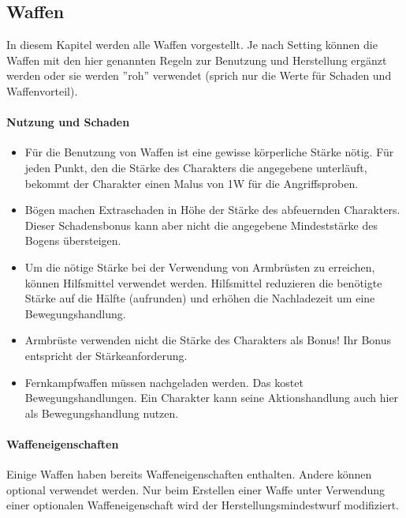 \documentclass{article}
\begin{document}
\begin{center}
\subsection{Waffen}
\end{center}

In diesem Kapitel werden alle Waffen vorgestellt. Je nach Setting können die Waffen mit den hier genannten Regeln
zur Benutzung und Herstellung ergänzt werden oder sie werden ''roh'' verwendet (sprich nur die Werte für Schaden und
Waffenvorteil).

\paragraph{Nutzung und Schaden}

\begin{itemize}
\item Für die Benutzung von Waffen ist eine gewisse körperliche Stärke nötig. Für jeden Punkt, den die Stärke des Charakters die angegebene unterläuft, bekommt der Charakter einen Malus von 1W für die Angriffsproben.
\item Bögen machen Extraschaden in Höhe der Stärke des abfeuernden Charakters. Dieser Schadensbonus kann aber nicht die angegebene Mindeststärke des Bogens übersteigen.
\item Um die nötige Stärke bei der Verwendung von Armbrüsten zu erreichen, können Hilfsmittel verwendet werden. Hilfsmittel reduzieren die benötigte Stärke auf die Hälfte (aufrunden) und erhöhen die Nachladezeit um eine Bewegungshandlung.
\item Armbrüste verwenden nicht die Stärke des Charakters als Bonus! Ihr Bonus entspricht der Stärkeanforderung.
\item Fernkampfwaffen müssen nachgeladen werden. Das kostet Bewegungshandlungen. Ein Charakter kann seine Aktionshandlung auch hier als Bewegungshandlung nutzen.
\end{itemize}

\paragraph{Waffeneigenschaften}

Einige Waffen haben bereits Waffeneigenschaften enthalten. Andere können optional verwendet werden. Nur beim Erstellen einer Waffe unter Verwendung einer optionalen Waffeneigenschaft wird der Herstellungsmindestwurf modifiziert.
\end{document}
